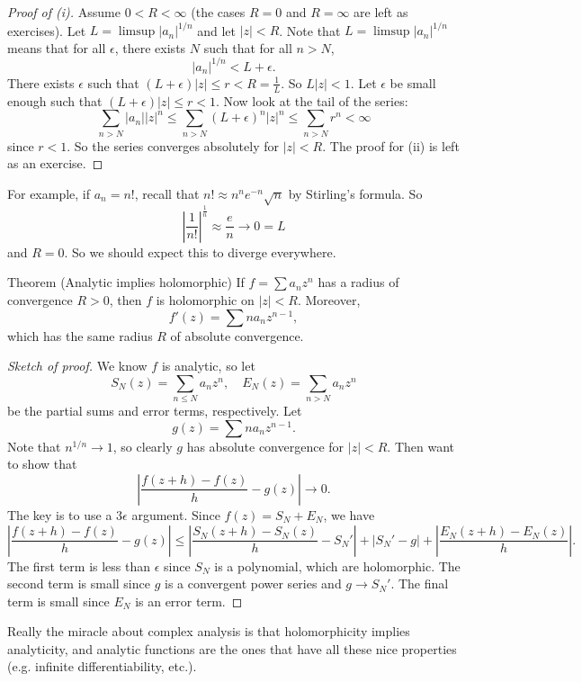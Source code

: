 \begin{proof}[Proof of (i)]
  Assume $0 < R < \infty$ (the cases $R = 0$ and
  $R = \infty$ are left as exercises). Let
  $L = \limsup |a_n|^{1 / n}$ and let $|z| < R$.
  Note that $L = \limsup |a_n|^{1 / n}$ means that for
  all $\epsilon$, there exists $N$ such that
  for all $n > N$,
  \[
    |a_n|^{1 / n} < L + \epsilon
  .\]
  There exists $\epsilon$ such that
  $(L + \epsilon)|z| \le r < R = \frac{1}{L}$.
  So $L|z| < 1$. Let $\epsilon$ be small enough such
  that $(L + \epsilon)|z| \le r < 1$.
  Now look at the tail of the series:
  \[
    \sum_{n > N} |a_n| |z|^n
    \le \sum_{n > N} (L + \epsilon)^n |z|^n
    \le \sum_{n > N} r^n < \infty
  \]
  since $r < 1$. So the series converges absolutely
  for $|z| < R$.
  The proof for (ii) is left as an exercise.
\end{proof}

For example, if $a_n = n!$, recall that
$n! \approx n^n e^{-n} \sqrt{n}$ by Stirling's formula.
So
\[
  \left|\frac{1}{n!}\right|^{\frac{1}{n}}
  \approx \frac{e}{n} \to 0 = L
\]
and $R = 0$. So we should expect this to diverge
everywhere.

\begin{thm}{Theorem (Analytic implies holomorphic)}
  If $f = \sum a_n z^n$ has a radius of convergence
  $R > 0$, then $f$ is holomorphic on $|z| < R$.
  Moreover,
  \[
    f'(z) = \sum n a_n z^{n - 1}
  ,\]
  which has the same radius $R$ of absolute convergence.
\end{thm}

\begin{proof}[Sketch of proof]
  We know $f$ is analytic, so let
  \[S_N(z) = \sum_{n \le N} a_n z^n, \quad E_N(z) = \sum_{n > N} a_n z^n\]
  be the partial sums and error terms, respectively.
  Let
  \[
    g(z) = \sum n a_n z^{n - 1}
  .\]
  Note that $n^{1 / n} \to 1$, so clearly $g$ has
  absolute convergence for $|z| < R$. Then want to
  show that
  \[
    \left|\frac{f(z + h) - f(z)}{h} - g(z)\right| \to 0
  .\]
  The key is to use a $3\epsilon$ argument.
  Since $f(z) = S_N + E_N$, we have
  \[
    \left|\frac{f(z + h) - f(z)}{h} - g(z)\right|
    \le \left|\frac{S_N(z + h) - S_N(z)}{h} - S_N'\right|
    + |S_N' - g| + \left|\frac{E_N(z + h) - E_N(z)}{h}\right|
  .\]
  The first term is less than $\epsilon$ since
  $S_N$ is a polynomial, which are holomorphic.
  The second term is small since $g$ is a convergent
  power series and $g \to S_N'$. The final term is
  small since $E_N$ is an error term.
\end{proof}

\begin{remark}
  Really the miracle about complex analysis is
  that holomorphicity implies analyticity, and analytic
  functions are the ones that have all these nice
  properties (e.g. infinite differentiability, etc.).
\end{remark}
